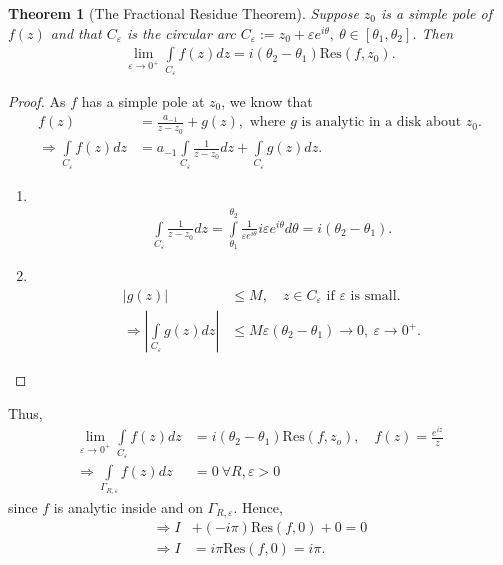 \documentclass[12pt, a4paper]{article}
\theoremstyle{plain}
\newtheorem{thm}{Theorem} %
\theoremstyle{definition}
\begin{document}
			\begin{thm}[The Fractional Residue Theorem]
				Suppose $z_0$ is a simple pole of $f(z)$ and that $C_\varepsilon$ is the circular arc $C_\varepsilon := z_0+\varepsilon e^{i\theta},\: \theta\in[\theta_1,\theta_2]$. Then
				\begin{align*}
					\lim\limits_{\varepsilon\to 0^+}\int\limits_{C_\varepsilon}f(z)dz = 
					i(\theta_2-\theta_1)\mathrm{Res}(f,z_0).
				\end{align*}
			\end{thm}

			\begin{proof}
				As $f$ has a simple pole at $z_0$, we know that
				\begin{align*}
					f(z) &= \frac{a_{-1}}{z-z_0}+g(z),\text{ where $g$ is analytic in a disk about $z_0$.}\\
					\Rightarrow \int\limits_{C_\varepsilon}f(z)dz &= 
					a_{-1}\int\limits_{C_\varepsilon}\frac{1}{z-z_0}dz +
					\int\limits_{C_\varepsilon}g(z)dz.
				\end{align*}
				\begin{enumerate}
					\item ~\\[-1cm]
					\begin{align*}
						\displaystyle\int\limits_{C_\varepsilon}\frac{1}{z-z_0}dz = \int\limits_{\theta_1}^{\theta_2}\frac{1}{\varepsilon e^{i\theta}}i \varepsilon e^{i\theta}d\theta = i(\theta_2-\theta_1).
					\end{align*}
					\item ~\\[-1cm]
					\begin{align*}
						|g(z)|&\le M,\quad z\in C_\varepsilon\text{ if $\varepsilon$ is small.}\\ \Rightarrow
						\left|\int\limits_{C_\varepsilon}g(z)dz\right|&\le M \varepsilon(\theta_2-\theta_1)\to 0,\: \varepsilon\to 0^+.
					\end{align*}
				\end{enumerate}
			\end{proof}

			Thus,
			\begin{align*}
				\lim\limits_{\varepsilon\to 0^+}\int\limits_{C_\varepsilon}f(z)dz &= i(\theta_2-\theta_1)\mathrm{Res}(f,z_o),\quad f(z) = \frac{e^{iz}}{z} \\ \Rightarrow 
				\int\limits_{\Gamma_{R,\varepsilon}}f(z)dz &= 0\:\forall R,\varepsilon>0
			\end{align*}
			since $f$ is analytic inside and on $\Gamma_{R,\varepsilon}$. Hence,
			\begin{align*}
				\Rightarrow I &+ (-i\pi)\mathrm{Res}(f,0)+0 = 0\\
				\Rightarrow I &= i\pi\mathrm{Res}(f,0) = i\pi.
			\end{align*}
\end{document}
